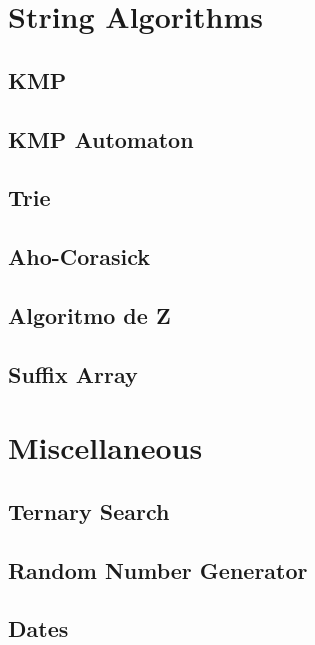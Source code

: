 \section{String Algorithms}
\subsection{KMP}
\raggedbottom
\hrulefill
\subsection{KMP Automaton}
\raggedbottom
\hrulefill
\subsection{Trie}
\raggedbottom
\hrulefill
\subsection{Aho-Corasick}
\raggedbottom
\hrulefill
\subsection{Algoritmo de Z}
\raggedbottom
\hrulefill
\subsection{Suffix Array}
\raggedbottom
\hrulefill

\section{Miscellaneous}
\subsection{Ternary Search}
\raggedbottom
\hrulefill
\subsection{Random Number Generator}
\raggedbottom
\hrulefill
\subsection{Dates}
\raggedbottom
\hrulefill
